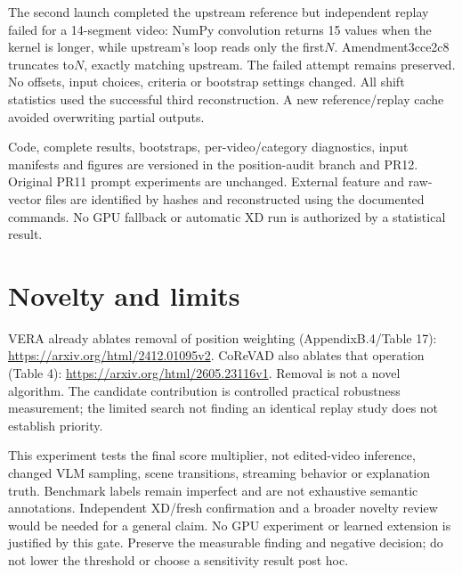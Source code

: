 \documentclass[11pt]{article}
\begin{document}
The second launch completed the upstream reference but independent replay failed for a 14-segment video: NumPy convolution returns 15 values when the kernel is longer, while upstream's loop reads only the first$N$. Amendment3cce2c8 truncates to$N$, exactly matching upstream. The failed attempt remains preserved. No offsets, input choices, criteria or bootstrap settings changed. All shift statistics used the successful third reconstruction. A new reference/replay cache avoided overwriting partial outputs.

Code, complete results, bootstraps, per-video/category diagnostics, input manifests and figures are versioned in the position-audit branch and PR12. Original PR11 prompt experiments are unchanged. External feature and raw-vector files are identified by hashes and reconstructed using the documented commands. No GPU fallback or automatic XD run is authorized by a statistical result.

\section{Novelty and limits}
VERA already ablates removal of position weighting (AppendixB.4/Table 17): \url{https://arxiv.org/html/2412.01095v2}. CoReVAD also ablates that operation (Table 4): \url{https://arxiv.org/html/2605.23116v1}. Removal is not a novel algorithm. The candidate contribution is controlled practical robustness measurement; the limited search not finding an identical replay study does not establish priority.

This experiment tests the final score multiplier, not edited-video inference, changed VLM sampling, scene transitions, streaming behavior or explanation truth. Benchmark labels remain imperfect and are not exhaustive semantic annotations. Independent XD/fresh confirmation and a broader novelty review would be needed for a general claim. No GPU experiment or learned extension is justified by this gate. Preserve the measurable finding and negative decision; do not lower the threshold or choose a sensitivity result post hoc.
\end{document}
